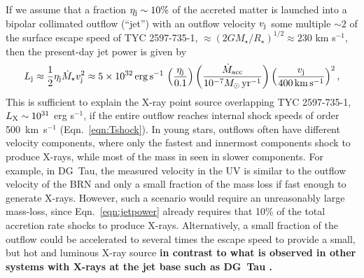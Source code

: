 \documentclass[linenumbers]{aastex631}
\newcommand{\be}{\begin{equation}}
\newcommand{\ee}{\end{equation}}
\begin{document}
If we assume that a fraction $\eta_{\rm j} \sim 10\%$ of the accreted matter is launched into a bipolar collimated outflow (``jet'') with an outflow velocity $v_{\rm j}$ some multiple $\sim 2$ of the surface escape speed of TYC 2597-735-1, $\approx (2GM_{\star}/R_{\star})^{1/2} \approx 230$ km s$^{-1}$, then the present-day jet power is given by
\be
L_{\rm j} \approx \frac{1}{2}\eta_{\rm j}\dot{M}_{\star}v_{\rm j}^{2} \approx 5\times 10^{32}\,{\rm erg\,s^{-1}}\,\left(\frac{\eta_{\rm j}}{0.1}\right)\left(\frac{\dot{M}_{\rm acc}}{10^{-7}M_{\odot}\,\rm yr^{-1}}\right)\left(\frac{v_{\rm j}}{400\,{\rm km\,s^{-1}}}\right)^{2},
\label{eqn:jetpower}
\ee
This is sufficient to explain the X-ray point source overlapping TYC 2597-735-1, $L_{\rm X} \sim 10^{31}$ erg s$^{-1}$, if the entire outflow reaches internal shock speeds of order 500~km~s$^{-1}$ (Eqn.~\ref{eqn:Tshock}).
In young stars, outflows often have different velocity components, where only the fastest and innermost components shock to produce X-rays, while most of the mass in seen in slower components. For example, in DG~Tau, the measured velocity in the UV is similar to the outflow velocity of the BRN and only a small fraction of the mass loss if fast enough to generate X-rays. However, such a scenario would require an unreasonably large mass-loss, since Eqn.~\ref{eqn:jetpower} already requires that 10\% of the total accretion rate shocks to produce X-rays. Alternatively, a small fraction of the outflow could be accelerated to several times the escape speed to provide a small, but hot and luminous X-ray source \textbf{in contrast to what is observed in other systems with X-rays at the jet base such as DG~Tau \citep{2009A&A...493..579G}.}
\end{document}
